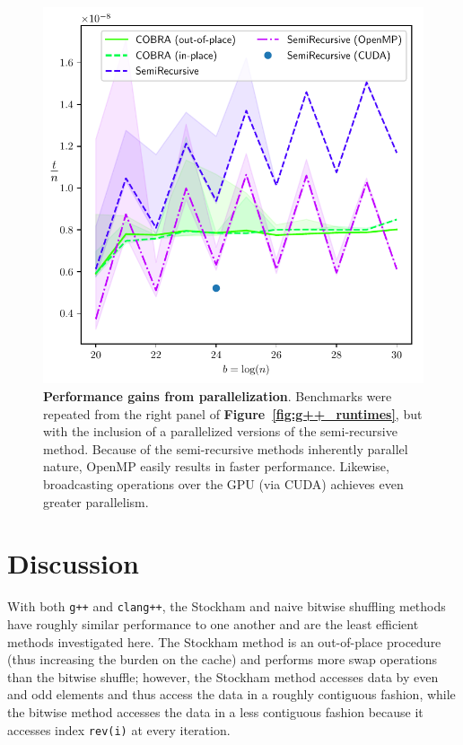 \documentclass[10pt]{article}
\begin{document}
\begin{figure}[ht!]
\centering
  \includegraphics[width=6in]{results/open_mp_performance.pdf}
\caption{{\bf Performance gains from parallelization}. Benchmarks were
  repeated from the right panel of {\bf
   Figure~\ref{fig:g++_runtimes}}, but with the inclusion of a
  parallelized versions of the semi-recursive method. Because of the
  semi-recursive methods inherently parallel nature, OpenMP easily
  results in faster performance. Likewise, broadcasting operations
  over the GPU (via CUDA) achieves even greater parallelism.
  \label{fig:g++_parallel_runtimes}
}
\end{figure}

\section*{Discussion}
With both {\tt g++} and {\tt clang++}, the Stockham and naive bitwise
shuffling methods have roughly similar performance to one another and
are the least efficient methods investigated here. The Stockham method
is an out-of-place procedure (thus increasing the burden on the cache)
and performs more swap operations than the bitwise shuffle; however,
the Stockham method accesses data by even and odd elements and thus
access the data in a roughly contiguous fashion, while the bitwise
method accesses the data in a less contiguous fashion because it
accesses index {\tt rev(i)} at every iteration.
\end{document}
